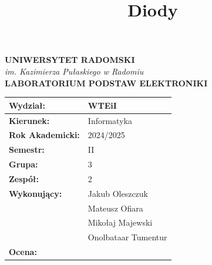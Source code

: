 \documentclass[10.5pt]{article}
\title{Diody}
\date{}
\begin{document}
\thispagestyle{empty} %

\begin{center}
    {\Large\textbf{UNIWERSYTET RADOMSKI}} \\
    \textit{im. Kazimierza Pułaskiego w Radomiu} \\
    \vspace{0.3cm}
    {\large\textbf{LABORATORIUM PODSTAW ELEKTRONIKI}} \\
\end{center}

\vspace{1.5cm}

\begin{center}
\end{center}

\vspace{1.5cm}

\begin{center}
\begin{tabular}{|>{\bfseries}p{4cm}|p{6cm}|}
\hline
Wydział: & WTEiI \\
\hline
Kierunek: & Informatyka \\
\hline
Rok Akademicki: & 2024/2025 \\
\hline
Semestr: & II \\
\hline
Grupa: & 3 \\
\hline
Zespół: & 2 \\
\hline
Wykonujący: & Jakub Oleszczuk \\
& Mateusz Ofiara \\
& Mikołaj Majewski \\
& Onolbataar Tumentur \\
\hline
Ocena: &  \\
\hline
\end{tabular}
\end{center}

\vspace{2cm}
\end{document}
